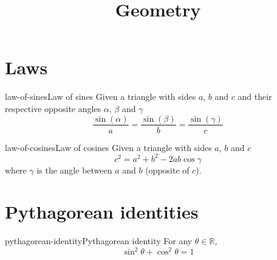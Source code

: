 \documentclass[preview]{standalone}
\begin{document}
\title{Geometry}
\genpage

\section{Laws}

\begin{snippettheorem}{law-of-sines}{Law of sines}
    Given a triangle with sides \(a\), \(b\) and \(c\) and their respective opposite angles
    \(\alpha\), \(\beta\) and \(\gamma\)
    \[
        \frac{\sin(\alpha)}{a} =
        \frac{\sin(\beta)}{b} =
        \frac{\sin(\gamma)}{c}
    \]
\end{snippettheorem}

\begin{snippettheorem}{law-of-cosines}{Law of cosines}
    Given a triangle with sides \(a\), \(b\) and \(c\)
    \[
        c^2 = a^2 + b^2 - 2ab\cos\gamma
    \]
    where \(\gamma\) is the angle between \(a\) and \(b\) (opposite of \(c\)).
\end{snippettheorem}

\section{Pythagorean identities}

\begin{snippettheorem}{pythagorean-identity}{Pythagorean identity}
    For any \(\theta \in \mathbb{R}\),
    \[
        \sin^2\theta + \cos^2\theta = 1
    \]
\end{snippettheorem}
\end{document}
